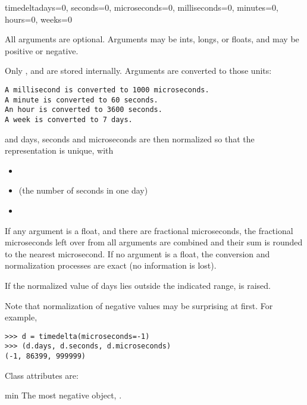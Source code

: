 \begin{classdesc}{timedelta}{days=0, seconds=0, microseconds=0,
                             milliseconds=0, minutes=0, hours=0, weeks=0}

  All arguments are optional.  Arguments may be ints, longs, or floats,
  and may be positive or negative.

  Only ,  and  are stored
  internally.  Arguments are converted to those units:

\begin{verbatim}
A millisecond is converted to 1000 microseconds.
A minute is converted to 60 seconds.
An hour is converted to 3600 seconds.
A week is converted to 7 days.
\end{verbatim}

  and days, seconds and microseconds are then normalized so that the
  representation is unique, with

\begin{itemize}
  \item {}
  \item {} (the number of seconds in one day)
  \item {}
\end{itemize}

  If any argument is a float, and there are fractional microseconds,
  the fractional microseconds left over from all arguments are combined
  and their sum is rounded to the nearest microsecond.  If no
  argument is a float, the conversion and normalization processes
  are exact (no information is lost).

  If the normalized value of days lies outside the indicated range,
   is raised.

  Note that normalization of negative values may be surprising at first.
  For example,

\begin{verbatim}
>>> d = timedelta(microseconds=-1)
>>> (d.days, d.seconds, d.microseconds)
(-1, 86399, 999999)
\end{verbatim}
\end{classdesc}

Class attributes are:

\begin{memberdesc}{min}
  The most negative  object,
  .
\end{memberdesc}

